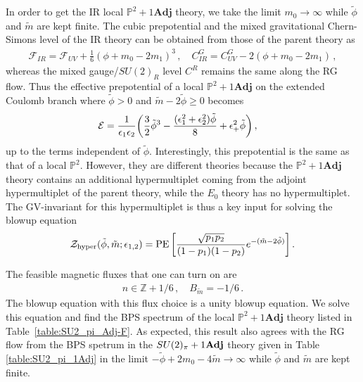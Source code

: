 In order to get the IR  local $\mathbb{P}^2+1\mathbf{Adj}$ theory, we take the limit $ m_0 \to \infty $ while $ \tilde{\phi} $ and $ \tilde{m} $ are kept finite. The cubic prepotential and the mixed gravitational Chern-Simons level of the IR  theory can be obtained from those of the parent theory as
\begin{align}
\mathcal{F}_{IR}=\mathcal{F}_{UV} + \frac{1}{6}(\phi+m_0-2m_1)^3 \, , \quad C^G_{IR} =C^G_{UV} -2(\phi+m_0-2m_1) \, ,
\end{align}
whereas the mixed gauge/$SU(2)_R$ level $C^R$ remains the same along the RG flow. Thus the effective prepotential of a local  $\mathbb{P}^2+1\mathbf{Adj}$ on the extended Coulomb branch where $\tilde\phi>0$ and $\tilde{m}-2\tilde{\phi}\geq 0$ becomes 
\begin{align}
\mathcal{E} &= \frac{1}{\epsilon_1 \epsilon_2} \qty(\frac{3}{2}\tilde{\phi}^3 - \frac{(\epsilon_1^2 + \epsilon_2^2)\tilde{\phi}}{8} + \epsilon_+^2 \tilde{\phi} ) \, ,
\end{align}
up to the terms independent of $\tilde\phi$. Interestingly, this prepotential is the same as that of a local $\mathbb{P}^2$. However, they are different theories because the  $\mathbb{P}^2+1\mathbf{Adj}$ theory contains an additional hypermultiplet coming from the adjoint hypermultiplet of the parent theory, while the $E_0$ theory has no hypermultiplet. The GV-invariant for this hypermultiplet is thus a key input for solving the blowup equation
\begin{equation}
\mathcal{Z}_{\rm hyper}(\tilde{\phi},\tilde{m};\epsilon_{1,2}) = \operatorname{PE} \qty[\frac{\sqrt{p_1p_2}}{(1-p_1)(1-p_2)}e^{-(\tilde{m}- 2\tilde\phi)}] \, .
\end{equation}

The feasible magnetic fluxes that one can turn on are
\begin{align}
n \in \mathbb{Z}+ 1/6 \, , \quad B_{\tilde{m}} = -1/6 \, .
\end{align}
The blowup equation with this flux choice is a unity blowup equation. We solve this equation and find the BPS spectrum of the local  $\mathbb{P}^2+1\mathbf{Adj}$ theory listed in Table~\ref{table:SU2_pi_Adj-F}. As expected, this result also agrees with the RG flow from the BPS spetrum in the $SU(2)_\pi+1{\bf Adj}$ theory given in Table \ref{table:SU2_pi_1Adj} in the limit $-\tilde{\phi}+2m_0-4\tilde{m}\rightarrow \infty$ while $\tilde\phi$ and $\tilde{m}$ are kept finite.

